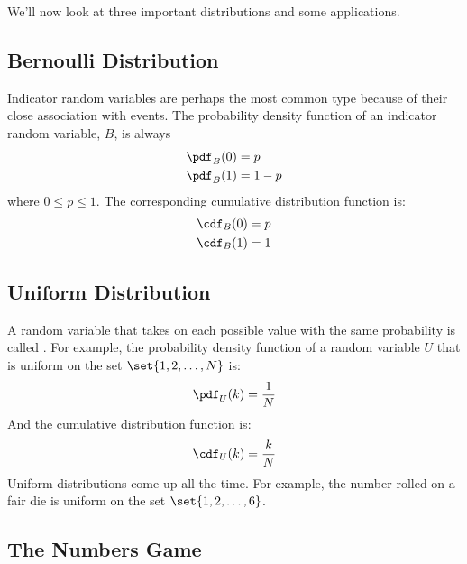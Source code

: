 We'll now look at three important distributions and some applications.

\subsection{Bernoulli Distribution}

 Indicator random variables are perhaps the most
common type because of their close association with events.  The
probability density function of an indicator random variable, $B$, is
always
%
\begin{align*}
\pdf_B(0) & = p \\
\pdf_B(1) & = 1 - p \\
\end{align*}
%
where $0 \leq p \leq 1$.  The corresponding cumulative distribution
function is:
%
\begin{align*}
\cdf_B(0) & = p \\
\cdf_B(1) & = 1
\end{align*}
%

\subsection{Uniform Distribution}

A random variable that takes on each possible value with the same
probability is called .  For example, the probability
density function of a random variable $U$ that is uniform on the set
$\set{1, 2, \dots, N}$ is:
%
\begin{align*}
\pdf_U(k) = \frac{1}{N}
\end{align*}
%
And the cumulative distribution function is:
%
\begin{align*}
\cdf_U(k) = \frac{k}{N}
\end{align*}
%
Uniform distributions come up all the time.  For example, the number
rolled on a fair die is uniform on the set $\set{1, 2, \dots, 6}$.

\subsection{The Numbers Game}

